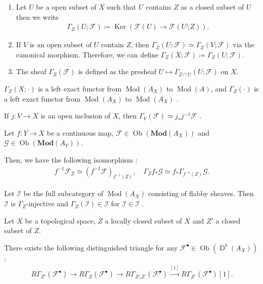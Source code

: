 \documentclass[a4paper,dvipdfmx,reqno,12pt]{amsart}
\theoremstyle{definition}
\newcommand{\deq}{\coloneqq}
\newcommand{\mcal}[1]{\mathcal{#1}}%
\newcommand{\opn}[1]{\operatorname{#1}}
\newcommand{\catn}[1]{\mathbf{#1}}
\newcommand{\xto}[1]{\xrightarrow{#1}}
\numberwithin{equation}{section}
\begin{document}
\begin{enumerate}
\item Let $U$ be a open subset of $X$ such that $U$ contains
$Z$ as a closed subset of $U$ then we write
\begin{align}
  \Gamma_Z(U;\mcal{F})\deq \opn{Ker}(\mcal{F}(U) \to 
\mcal{F}(U\setminus Z)).
\end{align}
\item If $V$ is an open subset of $U$ contain $Z$, then
$\Gamma_{Z}(U;\mcal{F})\simeq \Gamma_{Z}(V;\mcal{F})$
via the canonical morphism. Therefore, we can define
$\Gamma_{Z}(X;\mcal{F})\deq \Gamma_{Z}(U;\mcal{F})$.
\item The sheaf $\Gamma_{Z}(\mcal{F})$ is defined as the presheaf 
$U\mapsto \Gamma_{Z\cap U}(U;\mcal{F})$ on $X$.
\end{enumerate}

$\Gamma_Z(X;\cdot)$ is a left exact functor from 
$\opn{Mod}(A_X)$ to $\opn{Mod}(A)$,
and $\Gamma_{Z}(\cdot)$ is a left exact functor from
$\opn{Mod}(A_X)$ to $\opn{Mod}(A_X)$ 
\cite[Proposition 2.3.9 (i)]{MR1299726}.



If $j\colon V\to X$ is an open inclusion of $X$, then 
$\Gamma_V(\mathcal{F})\simeq j_*j^{-1}\mathcal{F}$ 
\cite[Proposition 2.3.9 (iii)]{MR1299726}.

Let $f\colon Y\to X$ be a continuous map,
$\mathcal{F}\in \opn{Ob}(\catn{Mod}(A_X))$
and $\mathcal{G}\in\opn{Ob}(\catn{Mod}(A_Y))$.

Then, we have the following isomorphism 
\cite[(2.3.19)-(2.3.20)]{MR1299726}:
\begin{align}
f^{-1}\mathcal{F}_Z\simeq 
(f^{-1}\mathcal{F})_{f^{-1}(Z)},\quad 
\Gamma_Zf_*\mathcal{G}\simeq f_*\Gamma_{f^{-1}(Z)}
\mathcal{G}.
\end{align}

Let $\mathscr{I}$ be the full subcategory of 
$\opn{Mod}(A_X)$ consisting of flabby sheaves. 
Then $\mathscr{I}$ is $\Gamma_{Z}$-injective and
$\Gamma_{Z}(\mathcal{I})\in\mathscr{I}$ for 
$\mathcal{I}\in \mathscr{I}$ \cite[Proposition 2.4.6]{MR1299726}.

Let $X$ be a topological space, $Z$ a locally 
closed subset of $X$ and $Z'$ a closed subset of $Z$.

There exists the following distinguished triangle 
for any $\mathcal{F}^{\bullet}\in \opn{Ob}(\opn{D}^{b}(A_X))$ 
\cite[(2.6.32)]{MR1299726}:
\begin{align} \label{equation-exact-local}
  R\Gamma_{Z'}(\mcal{F}^{\bullet})\to 
R\Gamma_{Z}(\mcal{F}^{\bullet})\to 
R\Gamma_{Z\setminus Z'}(\mcal{F}^{\bullet})\xto{[1]} 
R\Gamma_{Z'}(\mcal{F}^{\bullet})[1].
\end{align}
\end{document}
